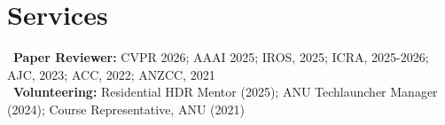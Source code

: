 \section*{Services}
\textbullet~\textbf{Paper Reviewer:} CVPR 2026; AAAI 2025; IROS, 2025; ICRA, 2025-2026; AJC, 2023; ACC, 2022; ANZCC, 2021\\[0.5em]
\textbullet~\textbf{Volunteering:} Residential HDR Mentor (2025); ANU Techlauncher Manager (2024); Course Representative, ANU (2021)